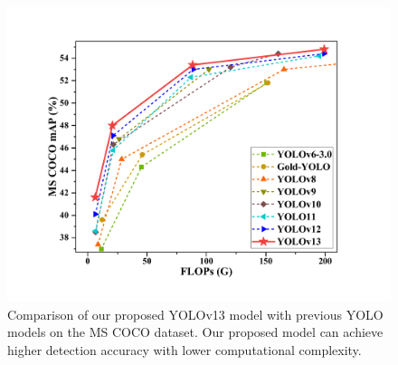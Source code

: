 \begin{figure}[!tbp]
    \centering
    \includegraphics[width=1\linewidth]{figures/fig1.pdf}
    \vspace{-0.6cm}
    \caption{Comparison of our proposed YOLOv13 model with previous YOLO models on the MS COCO dataset. Our proposed model can achieve higher detection accuracy with lower computational complexity.}
     \vspace{-0.6cm}
    \label{fig:fig1}
\end{figure}